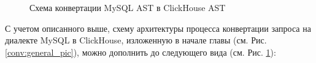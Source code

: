 \begin{figure}[ht]
\begin{center}
\caption{
\label{conv:spec_pic} Схема конвертации MySQL AST в ClickHouse AST
}
\end{center}
\end{figure}


С учетом описанного выше, схему архитектуры процесса конвертации запроса на диалекте MySQL в ClickHouse, изложенную в начале главы (см. Рис. \ref{conv:general_pic}), можно дополнить до следующего вида (см. Рис. \ref{conv:spec_pic}):

